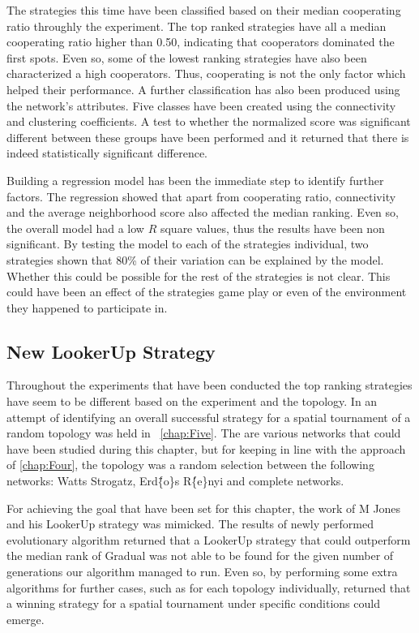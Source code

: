 The strategies this time have been classified based on their median cooperating
ratio throughly the experiment. The top ranked strategies have all a median cooperating
ratio higher than 0.50, indicating that cooperators
dominated the first spots. Even so, some of the lowest ranking strategies have
also been characterized a high cooperators. Thus, cooperating is not the only
factor which helped their performance. A further classification has also been
produced using the network's attributes. Five classes have been created using
the connectivity and clustering coefficients. A test to whether the normalized
score was significant different between these groups have been performed and it
returned that there is indeed statistically significant difference.

Building a regression model has been the immediate step to identify further factors.
The regression showed that apart from cooperating ratio, connectivity and the
average neighborhood score also affected the median ranking. Even so, the overall model
had a low \(R\) square values, thus the results have been non significant. By testing
the model to each of the strategies individual, two strategies shown that 80\% of
their variation can be explained by the model. Whether this could be possible
for the rest of the strategies is not clear. This could have been an effect of
the strategies game play or even of the environment they happened to participate in.

\subsection{New LookerUp Strategy}

Throughout the experiments that have been conducted the top ranking strategies
have seem to be different based on the experiment and the topology. In an attempt
of identifying an overall successful strategy for a spatial tournament of
a random topology was held in ~\autoref{chap:Five}. The are various networks
that could have been studied during this chapter, but for keeping in line with
the approach of \autoref{chap:Four}, the topology was a random selection between
the following networks: Watts Strogatz, Erd\"\{o\}s R\'\{e\}nyi and complete networks.

For achieving the goal that have been set for this chapter, the work of
M Jones and his LookerUp strategy was mimicked. The results of newly performed
evolutionary algorithm returned that a LookerUp strategy that could outperform
the median rank of Gradual was not able to be found for the given number of generations
our algorithm managed to run. Even so, by performing some extra algorithms for further
cases, such as for each topology individually, returned that a winning strategy for
a spatial tournament under specific conditions could emerge.


